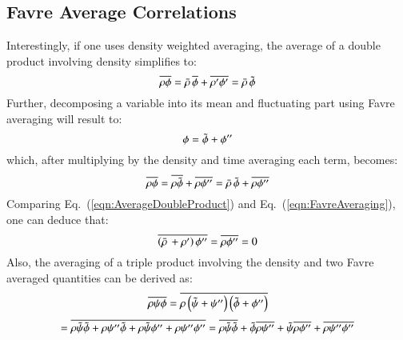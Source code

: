 \documentclass{warpdoc}
\newcommand{\mfd}{\displaystyle}
\begin{document}
\subsection{Favre Average Correlations}

Interestingly, if one uses density weighted averaging, the average of a
double product involving density simplifies to:
%
\begin{equation}
  \overline{\rho  \phi}
   =  \bar{\rho}\,  \overline{\phi}
                +\overline{\rho^{\prime}  \phi^{\prime}}
   =  \bar{\rho}\,  {\tilde{\phi}}
  \label{eqn:AverageDoubleProduct}
\end{equation}
%
Further, decomposing a variable into its mean and fluctuating part using
Favre averaging will result to:
%
\begin{equation}
  \phi={\tilde{\phi}}+\phi^{\prime\prime}
  \label{eqn:FavreDecomposition}
\end{equation}
%
which, after multiplying by the density and time averaging each term, becomes:
%
\begin{equation}
  \overline{\rho  \phi}
   = \overline{\rho  {\tilde{\phi}}} + \overline{\rho  \phi^{\prime\prime}}
   = \bar{\rho}\,  {\tilde{\phi}} + \overline{\rho  \phi^{\prime\prime}}
  \label{eqn:FavreAveraging}
\end{equation}
%
Comparing Eq.\ (\ref{eqn:AverageDoubleProduct}) and Eq.\ (\ref{eqn:FavreAveraging}),
one can deduce that:
%
\begin{equation}
  \overline{\left( \bar{\rho}\, + \rho^{\prime} \right)  \phi^{\prime\prime}}=\overline{\rho  \phi^{\prime\prime}}=0
\end{equation}
%
Also, the averaging of a triple product involving the density and
two Favre averaged quantities can be derived as:
%
%
\begin{displaymath}
  \mfd\overline{\rho \psi \phi} = \overline{\rho \left( {\wtilde{\psi}}+\psi^{\prime\prime}\right)
       \left( {\wtilde{\phi}}+\phi^{\prime\prime} \right)}
\end{displaymath}
%
\begin{displaymath}
   = \mfd\overline{
      \rho {\wtilde{\psi}} {\wtilde{\phi}}+\rho \psi^{\prime\prime} {\wtilde{\phi}}
     +\rho {\wtilde{\psi}} \phi^{\prime\prime}+\rho \psi^{\prime\prime} \phi^{\prime\prime}}
   = \mfd \overline{\rho {\wtilde{\psi}} {\wtilde{\phi}}}
            +{\wtilde{\phi}} \overline{\rho \psi^{\prime\prime}}
            +{\wtilde{\psi}} \overline{\rho \phi^{\prime\prime}}
            +\overline{\rho \psi^{\prime\prime} \phi^{\prime\prime}}
\end{displaymath}
\end{document}
